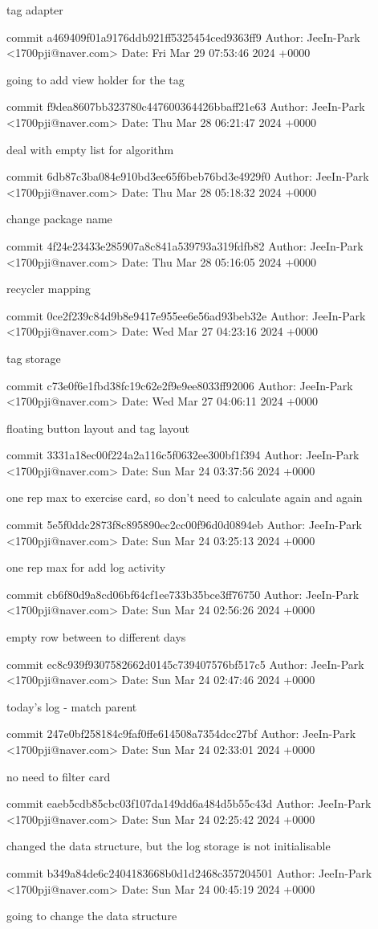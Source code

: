     tag adapter

commit a469409f01a9176ddb921ff5325454ced9363ff9
Author: JeeIn-Park <1700pji@naver.com>
Date:   Fri Mar 29 07:53:46 2024 +0000

    going to add view holder for the tag

commit f9dea8607bb323780c447600364426bbaff21e63
Author: JeeIn-Park <1700pji@naver.com>
Date:   Thu Mar 28 06:21:47 2024 +0000

    deal with empty list for algorithm

commit 6db87c3ba084e910bd3ee65f6beb76bd3e4929f0
Author: JeeIn-Park <1700pji@naver.com>
Date:   Thu Mar 28 05:18:32 2024 +0000

    change package name

commit 4f24e23433e285907a8c841a539793a319fdfb82
Author: JeeIn-Park <1700pji@naver.com>
Date:   Thu Mar 28 05:16:05 2024 +0000

    recycler mapping

commit 0ce2f239c84d9b8e9417e955ee6e56ad93beb32e
Author: JeeIn-Park <1700pji@naver.com>
Date:   Wed Mar 27 04:23:16 2024 +0000

    tag storage

commit c73e0f6e1fbd38fc19c62e2f9e9ee8033ff92006
Author: JeeIn-Park <1700pji@naver.com>
Date:   Wed Mar 27 04:06:11 2024 +0000

    floating button layout and tag layout

commit 3331a18ec00f224a2a116c5f0632ee300bf1f394
Author: JeeIn-Park <1700pji@naver.com>
Date:   Sun Mar 24 03:37:56 2024 +0000

    one rep max to exercise card, so don't need to calculate again and again

commit 5e5f0ddc2873f8c895890ec2cc00f96d0d0894eb
Author: JeeIn-Park <1700pji@naver.com>
Date:   Sun Mar 24 03:25:13 2024 +0000

    one rep max for add log activity

commit cb6f80d9a8cd06bf64cf1ee733b35bce3ff76750
Author: JeeIn-Park <1700pji@naver.com>
Date:   Sun Mar 24 02:56:26 2024 +0000

    empty row between to different days

commit ec8c939f9307582662d0145c739407576bf517c5
Author: JeeIn-Park <1700pji@naver.com>
Date:   Sun Mar 24 02:47:46 2024 +0000

    today's log - match parent

commit 247e0bf258184c9faf0ffe614508a7354dcc27bf
Author: JeeIn-Park <1700pji@naver.com>
Date:   Sun Mar 24 02:33:01 2024 +0000

    no need to filter card

commit eaeb5cdb85cbc03f107da149dd6a484d5b55c43d
Author: JeeIn-Park <1700pji@naver.com>
Date:   Sun Mar 24 02:25:42 2024 +0000

    changed the data structure, but the log storage is not initialisable

commit b349a84de6c2404183668b0d1d2468c357204501
Author: JeeIn-Park <1700pji@naver.com>
Date:   Sun Mar 24 00:45:19 2024 +0000

    going to change the data structure


